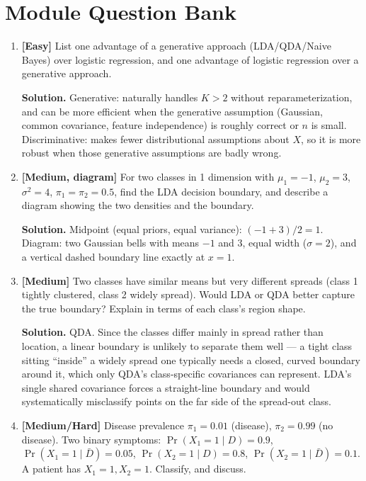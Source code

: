 \documentclass[11pt]{article}
\begin{document}
\section{Module Question Bank}

\begin{enumerate}
\item \textbf{[Easy]} List one advantage of a generative approach (LDA/QDA/Naive Bayes) over logistic regression, and one advantage of logistic regression over a generative approach.

\textbf{Solution.} Generative: naturally handles $K>2$ without reparameterization, and can be more efficient when the generative assumption (Gaussian, common covariance, feature independence) is roughly correct or $n$ is small. Discriminative: makes fewer distributional assumptions about $X$, so it is more robust when those generative assumptions are badly wrong.

\item \textbf{[Medium, diagram]} For two classes in 1 dimension with $\mu_1=-1$, $\mu_2=3$, $\sigma^2=4$, $\pi_1=\pi_2=0.5$, find the LDA decision boundary, and describe a diagram showing the two densities and the boundary.

\textbf{Solution.} Midpoint (equal priors, equal variance): $(-1+3)/2 = 1$. Diagram: two Gaussian bells with means $-1$ and $3$, equal width ($\sigma=2$), and a vertical dashed boundary line exactly at $x=1$.

\item \textbf{[Medium]} Two classes have similar means but very different spreads (class 1 tightly clustered, class 2 widely spread). Would LDA or QDA better capture the true boundary? Explain in terms of each class's region shape.

\textbf{Solution.} QDA. Since the classes differ mainly in spread rather than location, a linear boundary is unlikely to separate them well --- a tight class sitting ``inside'' a widely spread one typically needs a closed, curved boundary around it, which only QDA's class-specific covariances can represent. LDA's single shared covariance forces a straight-line boundary and would systematically misclassify points on the far side of the spread-out class.

\item \textbf{[Medium/Hard]} Disease prevalence $\pi_1=0.01$ (disease), $\pi_2=0.99$ (no disease). Two binary symptoms: $\Pr(X_1{=}1\mid D){=}0.9$, $\Pr(X_1{=}1\mid \bar D){=}0.05$, $\Pr(X_2{=}1\mid D){=}0.8$, $\Pr(X_2{=}1\mid \bar D){=}0.1$. A patient has $X_1{=}1, X_2{=}1$. Classify, and discuss.


\end{enumerate}
\end{document}
